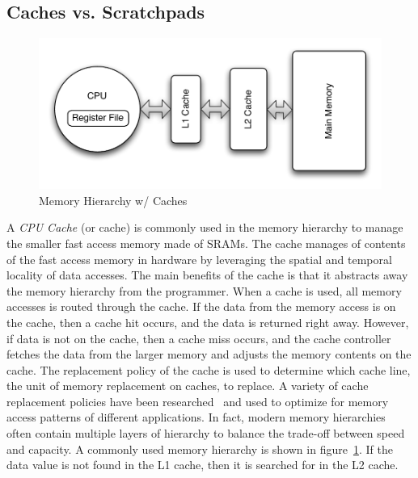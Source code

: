 \subsection{Caches vs. Scratchpads}
\begin{figure}
  \vspace{-20pt}
  \begin{center}
    \includegraphics[scale=.5]{figs/conventional_mem_hierarchy}
  \end{center}
  \vspace{-20pt}
  \caption{Memory Hierarchy w/ Caches}
  \label{fig:conventional_mem_hierarchy}
  \vspace{-10pt}
\end{figure}   
A \emph{CPU Cache} (or cache) is commonly used in the memory hierarchy to manage the smaller fast access memory made of SRAMs.
The cache manages of contents of the fast access memory in hardware by leveraging the spatial and temporal locality of data accesses. 
The main benefits of the cache is that it abstracts away the memory hierarchy from the programmer.
When a cache is used, all memory accesses is routed through the cache. 
If the data from the memory access is on the cache, then a cache hit occurs, and the data is returned right away.
However, if data is not on the cache, then a cache miss occurs, and the cache controller fetches the data from the larger memory and adjusts the memory contents on the cache. 
The replacement policy of the cache is used to determine which cache line, the unit of memory replacement on caches, to replace. 
A variety of cache replacement policies have been researched~ and used to optimize for memory access patterns of different applications. 
In fact, modern memory hierarchies often contain multiple layers of hierarchy to balance the trade-off between speed and capacity.
A commonly used memory hierarchy is shown in figure~\ref{fig:conventional_mem_hierarchy}.
If the data value is not found in the L1 cache, then it is searched for in the L2 cache. 
